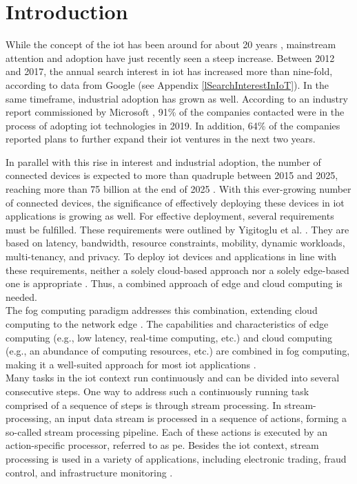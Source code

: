 \section{Introduction}
\label{lIntroduction}
While the concept of the \acrfull{iot} has been around for about 20 years \cite{Hutchison.2010}, mainstream attention and adoption have just recently seen a steep increase. Between 2012 and 2017, the annual search interest in \gls{iot} has increased more than nine-fold, according to data from Google (see Appendix \ref{lSearchInterestInIoT}). In the same timeframe, industrial adoption has grown as well. According to an industry report commissioned by Microsoft \cite{Microsoft.2020}, 91\% of the companies contacted were in the process of adopting \gls{iot} technologies in 2019. In addition, 64\% of the companies reported plans to further expand their \gls{iot} ventures in the next two years.\par
In parallel with this rise in interest and industrial adoption, the number of connected devices is expected to more than quadruple between 2015 and 2025, reaching more than 75 billion at the end of 2025 \cite{B.Safaei.2017}. With this ever-growing number of connected devices, the significance of effectively deploying these devices in \gls{iot} applications is growing as well. For effective deployment, several requirements must be fulfilled. These requirements were outlined by Yigitoglu et al. \cite{Yigitoglu.2017}. They are based on latency, bandwidth, resource constraints, mobility, dynamic workloads, multi-tenancy, and privacy. To deploy \gls{iot} devices and applications in line with these requirements, neither a solely cloud-based approach nor a solely edge-based one is appropriate \cite{Yousefpour.2019}. Thus, a combined approach of edge and cloud computing is needed.\\
The fog computing paradigm addresses this combination, extending cloud computing to the network edge \cite{Bonomi.2012}. The capabilities and characteristics of edge computing (e.g., low latency, real-time computing, etc.) and cloud computing (e.g., an abundance of computing resources, etc.) are combined in fog computing, making it a well-suited approach for most \gls{iot} applications \cite{Yousefpour.2019}.\\
Many tasks in the \gls{iot} context run continuously and can be divided into several consecutive steps. One way to address such a continuously running task comprised of a sequence of steps is through stream processing. In stream-processing, an input data stream is processed in a sequence of actions, forming a so-called stream processing pipeline. Each of these actions is executed by an action-specific processor, referred to as \acrfull{pe}. Besides the \gls{iot} context, stream processing is used in a variety of applications, including electronic trading, fraud control, and infrastructure monitoring \cite{Stonebraker.2005}.\\
